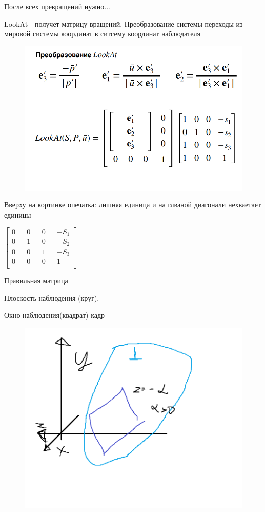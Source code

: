 \documentclass{article}
\begin{document}
После всех превращений нужно... 

LookAt - получет матрицу вращений. Преобразование системы переходы из  мировой системы координат
в ситсему координат наблюдателя

\begin{figure} [H]
    \includegraphics[width=0.70\linewidth]{Снимок экрана 2025-03-31 130706.png}
\end{figure}

Вверху на кортинке опечатка: лишняя единица и на глваной диагонали нехваетает единицы

\vspace{2mm}

$\begin{bmatrix}
    0 && 0 && 0 && -S_1 \\
    0 && 1 && 0 && -S_2 \\
    0 && 0 && 1 && -S_3 \\
    0 && 0 && 0 && 1 \\
\end{bmatrix}
$

\vspace{2mm}

Правильная матрица


Плоскость наблюдения (круг).

Окно наблюдения(квадрат) кадр

\begin{figure} [H]
    \includegraphics[width=0.70\linewidth]{набл.png}
\end{figure}
\end{document}
